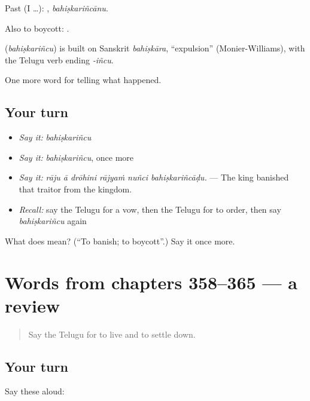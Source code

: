 Past (I …): , \emph{bahiṣkariñcānu}.

Also to boycott:   .

\begin{cousinweb}
\textbf{} (\emph{bahiṣkariñcu}) is built on Sanskrit \emph{bahiṣkāra}, \textquotedblleft{}expulsion\textquotedblright{} (Monier-Williams), with the Telugu verb ending \emph{-iñcu}.
\end{cousinweb}

\begin{grammarlens}[title={What you've built}]
One more word for telling what happened.
\end{grammarlens}

\subsection*{Your turn}
\begin{itemize}
\raggedright
  \item \emph{Say it:} \emph{bahiṣkariñcu}
  \item \emph{Say it:} \emph{bahiṣkariñcu}, once more
  \item \emph{Say it:} \emph{rāju ā drōhini rājyaṁ nuñci bahiṣkariñcāḍu.} — The king banished that traitor from the kingdom.
  \item \emph{Recall:} say the Telugu for a vow, then the Telugu for to order, then say \emph{bahiṣkariñcu} again
\end{itemize}

\begin{tcolorbox}[breakable,colback=teal!4,colframe=teal!35!black,title={Before you move on}]
What does  mean? (\textquotedblleft{}To banish; to boycott\textquotedblright{}.) Say it once more.
\end{tcolorbox}
\section[(dialogue)]{Words from chapters 358–365 — a review}

\label{lesson:TE-R365-review-358-365}



\begin{quote}
Say the Telugu for to live and to settle down.
\end{quote}

\subsection*{Your turn}
Say these aloud:

